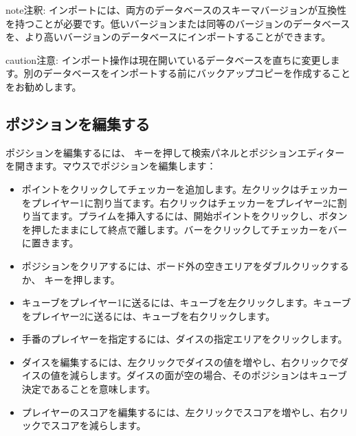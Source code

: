 \documentclass[letterpaper,10pt,dvipdfmx]{sphinxmanual}
\begin{document}
\begin{sphinxadmonition}{note}{注釈:}
\sphinxAtStartPar
インポートには、両方のデータベースのスキーマバージョンが互換性を持つことが必要です。低いバージョンまたは同等のバージョンのデータベースを、より高いバージョンのデータベースにインポートすることができます。
\end{sphinxadmonition}

\begin{sphinxadmonition}{caution}{注意:}
\sphinxAtStartPar
インポート操作は現在開いているデータベースを直ちに変更します。別のデータベースをインポートする前にバックアップコピーを作成することをお勧めします。
\end{sphinxadmonition}


\subsection{ポジションを編集する}
\label{\detokenize{guide_utilisateur:editer-une-position}}\label{\detokenize{guide_utilisateur:guide-edit-position}}
\sphinxAtStartPar
ポジションを編集するには、 キーを押して検索パネルとポジションエディターを開きます。マウスでポジションを編集します：
\begin{itemize}
\item {} 
\sphinxAtStartPar
ポイントをクリックしてチェッカーを追加します。左クリックはチェッカーをプレイヤー1に割り当てます。右クリックはチェッカーをプレイヤー2に割り当てます。プライムを挿入するには、開始ポイントをクリックし、ボタンを押したままにして終点で離します。バーをクリックしてチェッカーをバーに置きます。

\item {} 
\sphinxAtStartPar
ポジションをクリアするには、ボード外の空きエリアをダブルクリックするか、 キーを押します。

\item {} 
\sphinxAtStartPar
キューブをプレイヤー1に送るには、キューブを左クリックします。キューブをプレイヤー2に送るには、キューブを右クリックします。

\item {} 
\sphinxAtStartPar
手番のプレイヤーを指定するには、ダイスの指定エリアをクリックします。

\item {} 
\sphinxAtStartPar
ダイスを編集するには、左クリックでダイスの値を増やし、右クリックでダイスの値を減らします。ダイスの面が空の場合、そのポジションはキューブ決定であることを意味します。

\item {} 
\sphinxAtStartPar
プレイヤーのスコアを編集するには、左クリックでスコアを増やし、右クリックでスコアを減らします。

\end{itemize}
\end{document}

